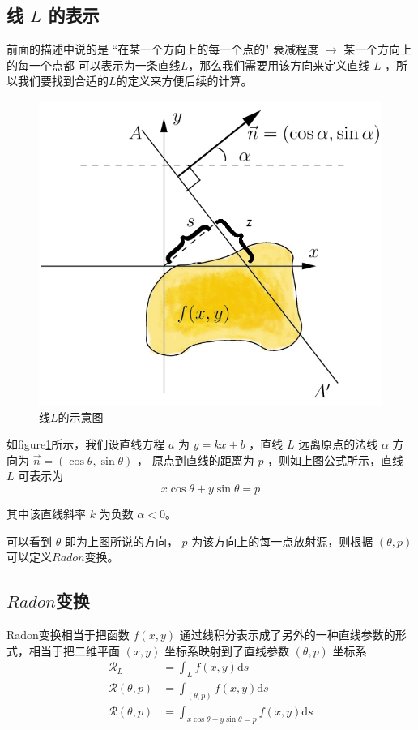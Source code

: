 \documentclass[hyperref]{ctexart}
\begin{document}
		\subsection{线 $L$ 的表示}
			前面的描述中说的是 “在某一个方向上的每一个点的" 衰减程度 $\rightarrow$ 某一个方向上的每一个点都 可以表示为一条直线$L$，那么我们需要用该方向来定义直线 $L$ ，所以我们要找到合适的$L$的定义来方便后续的计算。
			\begin{figure}[ht!]
				\centering
				\includegraphics[width=150mm]{Radon变换L的表示.png}
				\caption{线$L$的示意图 \label{线$L$的示意图}}
			\end{figure}

			如figure\ref{线$L$的示意图}所示，我们设直线方程 $a$ 为 $y=k x+b$ ，直线 $L$ 远离原点的法线 $\alpha$ 方向为 $\vec{n}=(\cos \theta, \sin \theta)$ ， 原点到直线的距离为 $p$ ，则如上图公式所示，直线 $L$ 可表示为
			\begin{equation}
				x \cos \theta+y \sin \theta=p
			\end{equation}

			其中该直线斜率 $k$ 为负数 $\alpha<0$。

			可以看到 $\theta$ 即为上图所说的方向， $p$ 为该方向上的每一点放射源，则根据 $(\theta, p)$ 可以定义$Radon$变换。

		\subsection{$Radon$变换}
			Radon变换相当于把函数 $f(x, y)$ 通过线积分表示成了另外的一种直线参数的形式，相当于把二维平面 $(x, y)$ 坐标系映射到了直线参数 $(\theta, p)$ 坐标系
			\begin{equation}
				\begin{aligned}
				\mathcal{R}_{L}&=\int_{L} f(x, y) \mathrm{d} s \\
				\mathcal{R}(\theta, p)&=\int_{(\theta, p)} f(x, y) \mathrm{d} s \\
				\mathcal{R}(\theta, p)&=\int_{x \cos \theta+y \sin \theta=p} f(x, y) \mathrm{d} s
				\end{aligned}
			\end{equation}
\end{document}
